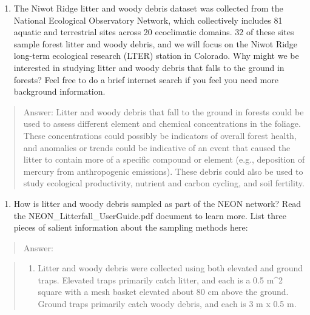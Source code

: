 \documentclass[]{article}
\providecommand{\tightlist}{%
  \setlength{\itemsep}{0pt}\setlength{\parskip}{0pt}}
\begin{document}
\begin{enumerate}
\def\labelenumi{\arabic{enumi}.}
\setcounter{enumi}{2}
\tightlist
\item
  The Niwot Ridge litter and woody debris dataset was collected from the
  National Ecological Observatory Network, which collectively includes
  81 aquatic and terrestrial sites across 20 ecoclimatic domains. 32 of
  these sites sample forest litter and woody debris, and we will focus
  on the Niwot Ridge long-term ecological research (LTER) station in
  Colorado. Why might we be interested in studying litter and woody
  debris that falls to the ground in forests? Feel free to do a brief
  internet search if you feel you need more background information.
\end{enumerate}

\begin{quote}
Answer: Litter and woody debris that fall to the ground in forests could
be used to assess different element and chemical concentrations in the
foliage. These concentrations could possibly be indicators of overall
forest health, and anomalies or trends could be indicative of an event
that caused the litter to contain more of a specific compound or element
(e.g., deposition of mercury from anthropogenic emissions). These debris
could also be used to study ecological productivity, nutrient and carbon
cycling, and soil fertility.
\end{quote}

\begin{enumerate}
\def\labelenumi{\arabic{enumi}.}
\setcounter{enumi}{3}
\tightlist
\item
  How is litter and woody debris sampled as part of the NEON network?
  Read the NEON\_Litterfall\_UserGuide.pdf document to learn more. List
  three pieces of salient information about the sampling methods here:
\end{enumerate}

\begin{quote}
Answer:
\end{quote}

\begin{quote}
\begin{enumerate}
\def\labelenumi{\arabic{enumi}.}
\tightlist
\item
  Litter and woody debris were collected using both elevated and ground
  traps. Elevated traps primarily catch litter, and each is a 0.5 m\^{}2
  square with a mesh basket elevated about 80 cm above the ground.
  Ground traps primarily catch woody debris, and each is 3 m x 0.5 m.
\end{enumerate}
\end{quote}
\end{document}
